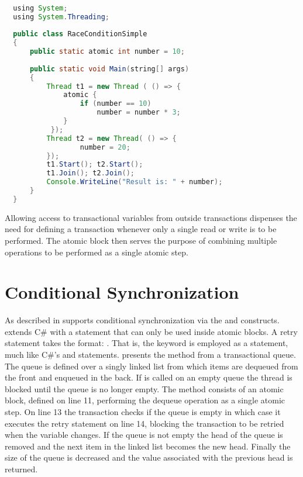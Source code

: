 \begin{lstlisting}[label=lst:stm_atomic_syntax_simplified,
  caption={Transaction Syntax Simplified},
  language=Java,  
  showspaces=false,
  showtabs=false,
  breaklines=true,
  showstringspaces=false,
  breakatwhitespace=true,
  commentstyle=\color{greencomments},
  keywordstyle=\color{bluekeywords},
  stringstyle=\color{redstrings},
  morekeywords={atomic, retry, orElse, var, get, set, using}]  % Start your code-block

  using System;
  using System.Threading;
  
  public class RaceConditionSimple
  {
      public static atomic int number = 10;
  
      public static void Main(string[] args)
      {
          Thread t1 = new Thread ( () => {
              atomic {
                  if (number == 10)           
                      number = number * 3;
              }
           });
          Thread t2 = new Thread( () => {
                  number = 20;
          });
          t1.Start(); t2.Start();
          t1.Join(); t2.Join();
          Console.WriteLine("Result is: " + number);
      }
  }
\end{lstlisting}
Allowing access to transactional variables from outside transactions dispenses the need for defining a transaction whenever only a single read or write is to be performed. The atomic block then serves the purpose of combining multiple operations to be performed as a single atomic step.

\section{Conditional Synchronization}\label{sec:sync_design}
As described in  \stmnamesp supports conditional synchronization via the  and  constructs. \stmnamesp extends C\# with a  statement that can only be used inside atomic blocks. A retry statement takes the format: . That is, the keyword is employed as a statement, much like C\#'s  and  statements\cite[p. 102]{sestoft2011c}.  presents the  method from a transactional queue. The queue is defined over a singly linked list from which items are dequeued from the front and enqueued in the back. If  is called on an empty queue the thread is blocked until the queue is no longer empty. The  method consists of an atomic block, defined on line 11, performing the dequeue operation as a single atomic step. On line 13 the transaction checks if the queue is empty in which case it executes the retry statement on line 14, blocking the transaction to be retried when the  variable changes. If the queue is not empty the head of the queue is removed and the next item in the linked list becomes the new head. Finally the size of the queue is decreased and the value associated with the previous head is returned. 

